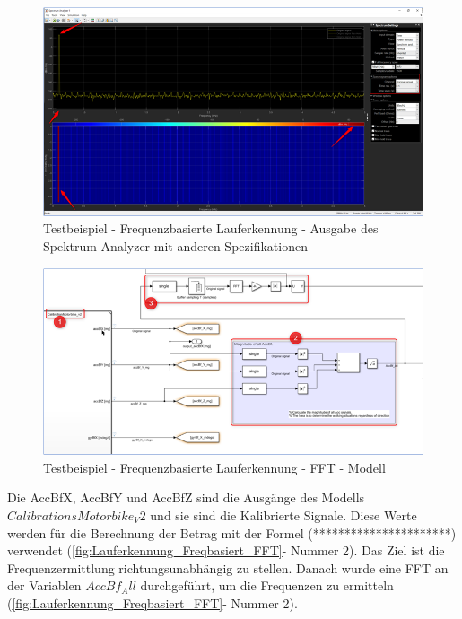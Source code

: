 \begin{figure}[H]
	\centering
	\includegraphics[width=\linewidth]{Bilder/Lauferkennung_Freqbasiert_SpektrumAnalyzerAusgabe_2Einstellungen.png}
	\caption{Testbeispiel - Frequenzbasierte Lauferkennung - Ausgabe des Spektrum-Analyzer mit anderen Spezifikationen}
	\label{fig:Lauferkennung_Freqbasiert_SpektrumAnalyzerAusgabe_2Einstellungen}
\end{figure}

\begin{figure}[H]
	\centering
	\includegraphics[width=\linewidth]{Bilder/Lauferkennung_Freqbasiert_FFT.png}
	\caption{Testbeispiel - Frequenzbasierte Lauferkennung - FFT - Modell}
	\label{fig:Lauferkennung_Freqbasiert_FFT}
\end{figure}

Die AccBfX, AccBfY und AccBfZ sind die Ausgänge des Modells $CalibrationsMotorbike_V2$ und sie sind die Kalibrierte Signale.
Diese Werte werden für die Berechnung der Betrag mit der Formel (**********************)
verwendet (\autoref{fig:Lauferkennung_Freqbasiert_FFT}- Nummer 2). Das Ziel ist die Frequenzermittlung richtungsunabhängig zu stellen.
Danach wurde eine FFT an der Variablen $AccBf_All$ durchgeführt, um die Frequenzen zu ermitteln (\autoref{fig:Lauferkennung_Freqbasiert_FFT}- Nummer 2).


